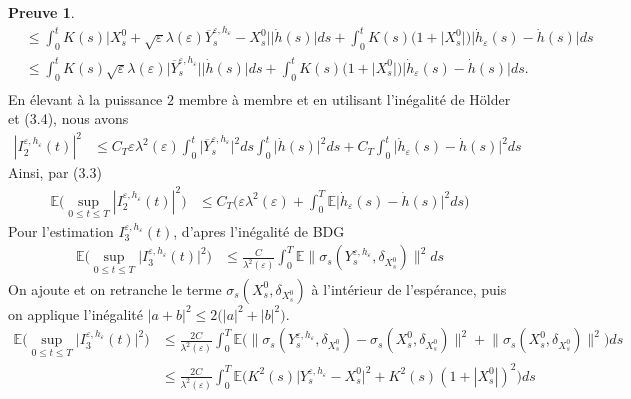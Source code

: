 \documentclass[12pt,a4paper,twoside]{report}%
\theoremstyle{definition}
\newtheorem*{pr}{\textbf{Preuve}}
\numberwithin{equation}{section}
\begin{document}
\begin{pr}
\[\begin{aligned}
	 	&\leq \int_{0}^{t}K(s)\big|X_s^0+\sqrt{\varepsilon}\lambda(\varepsilon)\overline{Y}_s^{\varepsilon,h_\varepsilon} -X_s^0\big|\big|\dot{h}(s)\big|ds + \int_{0}^{t}K(s)\big(1 + \big|X_s^0\big|\big)\big|\dot{h}_\varepsilon(s)-\dot{h}(s)\big|ds\\
	 	&\leq \int_{0}^{t}K(s)\sqrt{\varepsilon}\lambda(\varepsilon)\big|\overline{Y}_s^{\varepsilon,h_\varepsilon}\big|\big|\dot{h}(s)\big|ds + \int_{0}^{t}K(s)\big(1 + \big|X_s^0\big|\big)\big|\dot{h}_\varepsilon(s)-\dot{h}(s)\big|ds.\\
	 	 \end{aligned}
	 \]
	 En élevant à la puissance $2$ membre à membre et en utilisant l'inégalité de Hölder et (3.4), nous avons
	 \[
	 \begin{aligned}
	 	|I_2^{\varepsilon,h_\varepsilon}(t)|^2 &\leq C_T\varepsilon\lambda^2(\varepsilon)\int_{0}^{t}\big|\overline{Y}_s^{\varepsilon,h_\varepsilon}\big|^2ds\int_{0}^{t}\big|\dot{h}(s)\big|^2ds + C_T\int_{0}^{t}\big|\dot{h}_\varepsilon(s)-\dot{h}(s)\big|^2ds
	 \end{aligned}
	 \]
	 Ainsi, par (3.3)
	\[
	\begin{aligned}
		\mathbb{E}\big(\sup_{0 \leq t \leq T}|I_2^{\varepsilon,h_\varepsilon}(t)|^2\big)&\leq C_T\big(\varepsilon\lambda^2(\varepsilon) + \int_{0}^{T}\mathbb{E}\big|\dot{h}_\varepsilon(s)-\dot{h}(s)\big|^2ds\big)
	\end{aligned}
	\]
	Pour l'estimation $I_3^{\varepsilon,h_\varepsilon}(t)$, d'apres l'inégalité de BDG
	\[
	\begin{aligned}
	\mathbb{E}\big(\sup_{0 \leq t \leq T}\big|I_3^{\varepsilon,h_\varepsilon}(t)\big|^2\big)&\leq \frac{C}{\lambda^2(\varepsilon)}\int_{0}^{T}\mathbb{E}\big\|\sigma_{s}(Y_s^{\varepsilon,h_\varepsilon},\delta_{X_{s}^{0}})\big\|^2ds
	\end{aligned}
	\]
	On ajoute et on retranche le terme $\sigma_{s}(X_s^0,\delta_{X_{s}^{0}})$ à l'intérieur de l'espérance, puis on applique l'inégalité
	$|a+b|^2 \leq 2\big(|a|^2+|b|^2\big)$.
	\[
	\begin{aligned}
		\mathbb{E}\big(\sup_{0 \leq t \leq T}\big|I_3^{\varepsilon,h_\varepsilon}(t)\big|^2\big)&\leq  \frac{2C}{\lambda^2(\varepsilon)} \int_{0}^{T}\mathbb{E}\Big(\big\|\sigma_{s}(Y_s^{\varepsilon,h_\varepsilon},\delta_{X_{s}^{0}}) -\sigma_{s}(X_s^0,\delta_{X_{s}^{0}})\big\|^2 + \big\|\sigma_{s}(X_s^0,\delta_{X_{s}^{0}})\big\|^2\Big)ds\\
		&\leq \frac{2C}{\lambda^2(\varepsilon)} \int_{0}^{T}\mathbb{E}\Big(K^2(s)\big|Y_s^{\varepsilon,h_\varepsilon} -X_s^0\big|^2 + K^2(s)(1+|X_s^0|)^2\Big)ds\\

\end{aligned}\]
\end{pr}
\end{document}
